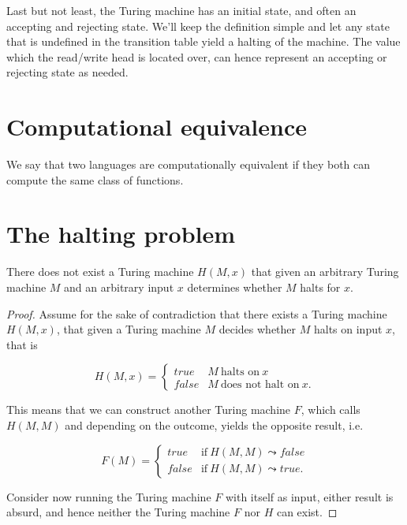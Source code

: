 Last but not least, the Turing machine has an initial state, and often an
accepting and rejecting state. We'll keep the definition simple and let any
state that is undefined in the transition table yield a halting of the machine.
The value which the read/write head is located over, can hence represent an
accepting or rejecting state as needed.

\section{Computational equivalence}

\begin{definition} We say that two languages are computationally equivalent if
they both can compute the same class of functions.\end{definition}

\section{The halting problem}

\begin{theorem} There does not exist a Turing machine $H(M,x)$ that given an
arbitrary Turing machine $M$ and an arbitrary input $x$ determines whether $M$
halts for $x$.\end{theorem}

\begin{proof}

Assume for the sake of contradiction that there exists a Turing machine
$H(M,x)$, that given a Turing machine $M$ decides whether $M$ halts on input
$x$, that is

$$H(M,x)=\left\{
\begin{array}{ll}
true&M\ \text{halts on}\ x\\
false&M\ \text{does not halt on}\ x.
\end{array}
\right.$$

This means that we can construct another Turing machine $F$, which calls
$H(M,M)$ and depending on the outcome, yields the opposite result, i.e. 

$$F(M)=\left\{
\begin{array}{ll}
true&\text{if}\ H(M,M)\leadsto false\\
false&\text{if}\ H(M,M)\leadsto true.
\end{array}
\right.$$

Consider now running the Turing machine $F$ with itself as input, either result
is absurd, and hence neither the Turing machine $F$ nor $H$ can
exist.\end{proof}

